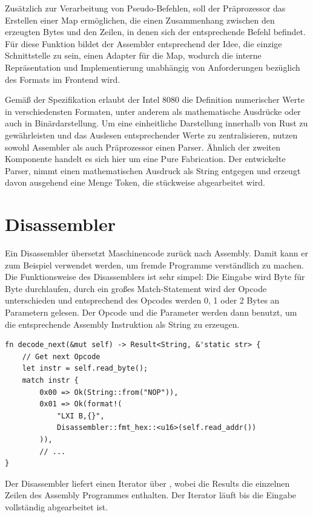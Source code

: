 Zusätzlich zur Verarbeitung von Pseudo-Befehlen, soll der Präprozessor das Erstellen einer Map ermöglichen, die einen Zusammenhang zwischen den erzeugten Bytes und den Zeilen, in denen sich der entsprechende Befehl befindet. Für diese Funktion bildet der Assembler entsprechend der Idee, die einzige Schnittstelle zu sein, einen Adapter für die Map, wodurch die interne Repräsentation und Implementierung unabhängig von Anforderungen bezüglich des Formats im Frontend wird.

Gemäß der Spezifikation erlaubt der Intel 8080 die Definition numerischer Werte in verschiedensten Formaten, unter anderem als mathematische Ausdrücke oder auch in Binärdarstellung. Um eine einheitliche Darstellung innerhalb von Rust zu gewährleisten und das Auslesen entsprechender Werte zu zentralisieren, nutzen sowohl Assembler als auch Präprozessor einen Parser. Ähnlich der zweiten Komponente handelt es sich hier um eine Pure Fabrication. Der entwickelte Parser, nimmt einen mathematischen Ausdruck als String entgegen und erzeugt davon ausgehend eine Menge Token, die stückweise abgearbeitet wird.

\section{Disassembler}

Ein Disassembler übersetzt Maschinencode zurück nach Assembly. Damit kann er zum Beispiel verwendet werden, um fremde Programme verständlich zu machen.
Die Funktionsweise des Disassemblers ist sehr simpel: Die Eingabe wird Byte für Byte durchlaufen, durch ein großes Match-Statement wird der Opcode unterschieden und entsprechend des Opcodes werden 0, 1 oder 2 Bytes an Parametern gelesen. Der Opcode und die Parameter werden dann benutzt, um die entsprechende Assembly Instruktion als String zu erzeugen.

\begin{verbatim}
fn decode_next(&mut self) -> Result<String, &'static str> {
    // Get next Opcode
    let instr = self.read_byte();
    match instr {
        0x00 => Ok(String::from("NOP")),
        0x01 => Ok(format!(
            "LXI B,{}",
            Disassembler::fmt_hex::<u16>(self.read_addr())
        )),
        // ...
}
\end{verbatim}

Der Disassembler liefert einen Iterator über , wobei die Results die einzelnen Zeilen des Assembly Programmes enthalten. Der Iterator läuft bis die Eingabe vollständig abgearbeitet ist.

